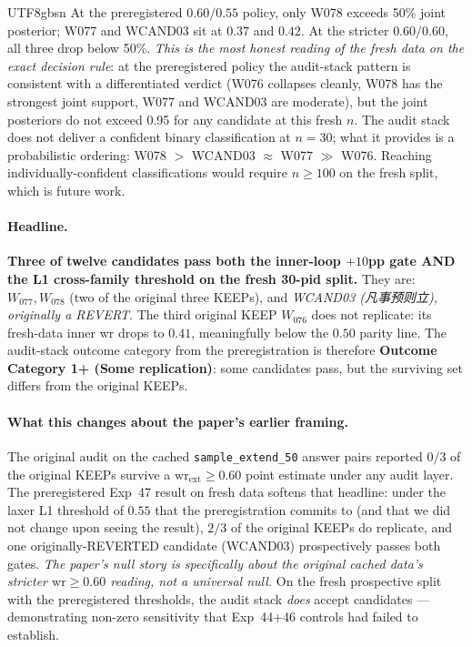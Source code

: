 \documentclass{article}
\begin{document}
\begin{CJK*}{UTF8}{gbsn}
\noindent At the preregistered \(0.60/0.55\) policy, only W078
exceeds 50\% joint posterior; W077 and WCAND03 sit at \(0.37\)
and \(0.42\). At the stricter \(0.60/0.60\), all three drop
below 50\%. \emph{This is the most honest reading of the fresh
data on the exact decision rule}: at the preregistered policy
the audit-stack pattern is consistent with a differentiated
verdict (W076 collapses cleanly, W078 has the strongest joint
support, W077 and WCAND03 are moderate), but the joint
posteriors do not exceed 0.95 for any candidate at this fresh
\(n\). The audit stack does not deliver a confident binary
classification at \(n=30\); what it provides is a probabilistic
ordering: W078 \(>\) WCAND03 \(\approx\) W077 \(\gg\) W076.
Reaching individually-confident classifications would require
\(n \geq 100\) on the fresh split, which is future work.

\paragraph{Headline.}
\textbf{Three of twelve candidates pass both the inner-loop
\(+10\)pp gate AND the L1 cross-family threshold on the fresh
30-pid split.} They are: \(W_{077}, W_{078}\) (two of the original
three KEEPs), and \emph{WCAND03 \emph{(凡事预则立)}, originally a
REVERT}. The third original KEEP \(W_{076}\) does not replicate:
its fresh-data inner wr drops to \(0.41\), meaningfully below the
\(0.50\) parity line. The audit-stack outcome category from the
preregistration is therefore \textbf{Outcome Category 1+ (Some
replication)}: some candidates pass, but the surviving set
differs from the original KEEPs.

\paragraph{What this changes about the paper's earlier framing.}
The original audit on the cached \texttt{sample\_extend\_50}
answer pairs reported \(0/3\) of the original KEEPs survive a
\(\mathrm{wr}_{\mathrm{ext}} \geq 0.60\) point estimate under any
audit layer. The preregistered Exp~47 result on fresh data
softens that headline: under the laxer L1 threshold of \(0.55\)
that the preregistration commits to (and that we did not change
upon seeing the result), \(2/3\) of the original KEEPs do
replicate, and one originally-REVERTED candidate (WCAND03)
prospectively passes both gates. \emph{The paper's null story is
specifically about the original cached data's stricter
\(\mathrm{wr} \geq 0.60\) reading, not a universal null.} On the
fresh prospective split with the preregistered thresholds, the
audit stack \emph{does} accept candidates --- demonstrating
non-zero sensitivity that Exp~44+46 controls had failed to
establish.


\end{CJK*}
\end{document}
